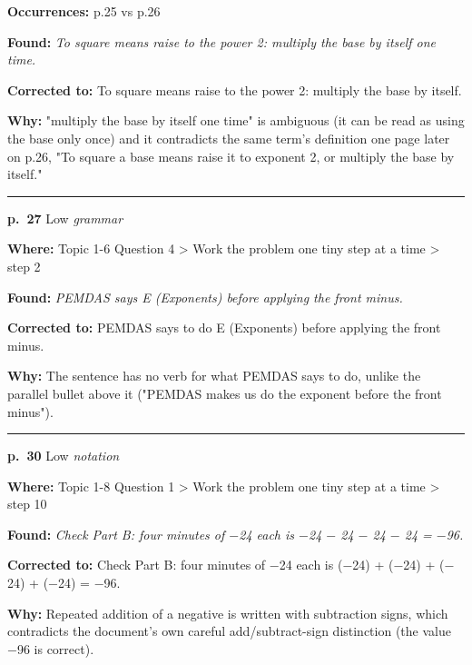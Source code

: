 \documentclass[11pt]{article}
\newcommand{\sevlow}[1]{\textcolor{black!55}{#1}}
\begin{document}
\noindent\textbf{Occurrences: }p.25 vs p.26\par
\noindent\textbf{Found: }\textit{To square means raise to the power 2: multiply the base by itself one time.}\par
\noindent\textbf{Corrected to: }To square means raise to the power 2: multiply the base by itself.\par
\noindent\textbf{Why: }"multiply the base by itself one time" is ambiguous (it can be read as using the base only once) and it contradicts the same term's definition one page later on p.26, "To square a base means raise it to exponent 2, or multiply the base by itself."\par\vspace{4pt}
\noindent\rule{\textwidth}{0.4pt}\par\nobreak\vspace{2pt}
\noindent\textbf{p.~27} \quad \sevlow{Low} \quad \textit{grammar}\par
\noindent\textbf{Where: }Topic 1-6 Question 4 > Work the problem one tiny step at a time > step 2\par
\noindent\textbf{Found: }\textit{PEMDAS says E (Exponents) before applying the front minus.}\par
\noindent\textbf{Corrected to: }PEMDAS says to do E (Exponents) before applying the front minus.\par
\noindent\textbf{Why: }The sentence has no verb for what PEMDAS says to do, unlike the parallel bullet above it ("PEMDAS makes us do the exponent before the front minus").\par\vspace{4pt}
\noindent\rule{\textwidth}{0.4pt}\par\nobreak\vspace{2pt}
\noindent\textbf{p.~30} \quad \sevlow{Low} \quad \textit{notation}\par
\noindent\textbf{Where: }Topic 1-8 Question 1 > Work the problem one tiny step at a time > step 10\par
\noindent\textbf{Found: }\textit{Check Part B: four minutes of $-$24 each is $-$24 $-$ 24 $-$ 24 $-$ 24 = $-$96.}\par
\noindent\textbf{Corrected to: }Check Part B: four minutes of $-$24 each is ($-$24) + ($-$24) + ($-$24) + ($-$24) = $-$96.\par
\noindent\textbf{Why: }Repeated addition of a negative is written with subtraction signs, which contradicts the document's own careful add/subtract-sign distinction (the value $-$96 is correct).\par\vspace{4pt}
\end{document}
